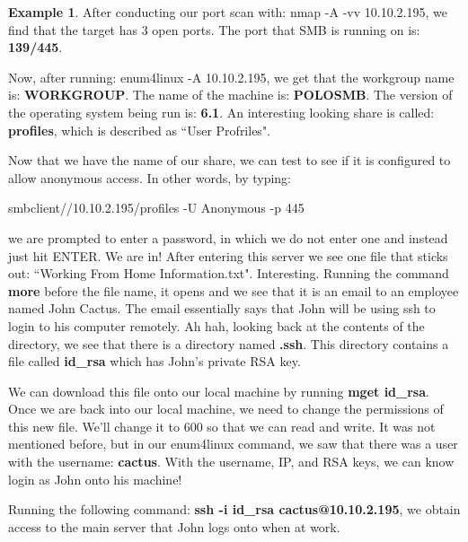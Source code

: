 \documentclass[12pt]{article}
\theoremstyle{definition}
\theoremstyle{definition}
\newtheorem{exmp}{Example}[section]
\begin{document}
\begin{exmp}
            After conducting our port scan with: nmap -A -vv 10.10.2.195, we
            find that the target has 3 open ports. The port that SMB is running
            on is: \textbf{139/445}.\par Now, after running: enum4linux -A 10.10.2.195,
            we get that the workgroup name is: \textbf{WORKGROUP}. The name of
            the machine is: \textbf{POLOSMB}. The version of the operating system being
            run is: \textbf{6.1}. An interesting looking share is called:
            \textbf{profiles}, which is described as ``User Profriles".
            \par Now that we have the name of our share, we
            can test to see if it is configured to allow anonymous access. In
            other words, by typing:\par smbclient//10.10.2.195/profiles -U
            Anonymous -p 445\par we are prompted to enter a password, in which
            we do not enter one and instead just hit ENTER. We are in! After
            entering this server we see one file that sticks out: ``Working
            From Home Information.txt". Interesting. Running the command
            \textbf{more} before the file name, it opens and we see that it is
            an email to an employee named John Cactus. The email essentially
            says that John will be using ssh to login to his computer remotely.
            Ah hah, looking back at the contents of the directory, we see that
            there is a directory named \textbf{.ssh}. This directory contains
            a file called \textbf{id\_rsa} which has John's private RSA key.\par
            We can download this file onto our local machine by running
            \textbf{mget id\_rsa}. Once we are back into our local machine, we
            need to change the permissions of this new file. We'll change it to
            600 so that we can read and write. It was not mentioned before, but
            in our enum4linux command, we saw that there was a user with the
            username: \textbf{cactus}. With the username, IP, and RSA keys, we
            can know login as John onto his machine! \par Running the following
            command: \textbf{ssh -i id\_rsa cactus@10.10.2.195}, we obtain
            access to the main server that John logs onto when at work. 
        \end{exmp}
\end{document}
